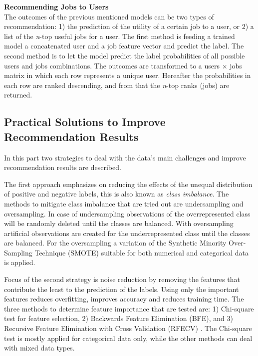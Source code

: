 \noindent
\textbf{Recommending Jobs to Users} \\
The outcomes of the previous mentioned models can be two types of recommendation: 1) the prediction of the utility of a certain job to a user, or 2) a list of the \textit{n}-top useful jobs for a user.
The first method is feeding a trained model a concatenated user and a job feature vector and predict the label.
The second method is to let the model predict the label probabilities of all possible users and jobs combinations. 
The outcomes are transformed to a users $\times$ jobs matrix in which each row represents a unique user.
Hereafter the probabilities in each row are ranked descending, and from that the \textit{n}-top ranks (jobs) are returned. 

\subsection{Practical Solutions to Improve Recommendation Results}
\label{ssec:psirr}
In this part two strategies to deal with the data’s main challenges and  improve recommendation results are described.

The first approach emphasizes on reducing the effects of the unequal distribution of positive and negative labels, this is also known as \textit{class imbalance}. 
The methods to mitigate class imbalance that are tried out are undersampling and oversampling. 
In case of undersampling observations of the overrepresented class will be randomly deleted until the classes are balanced. 
With oversampling artificial observations are created for the underrepresented class until the classes are balanced. 
For the oversampling a variation of the Synthetic Minority Over-Sampling Technique (SMOTE) \cite{chawla2002smote} suitable for both numerical and categorical data is applied. 

Focus of the second strategy is noise reduction by removing the features that contribute the least to the prediction of the labels.
Using only the important features reduces overfitting, improves accuracy and reduces training time. 
The three methods to determine feature importance that are tested are: 1) Chi-square test for feature selection, 2) Backwards Feature Elimination (BFE), and 3) Recursive Feature Elimination with Cross Validation (RFECV) \cite{guyon2002gene}. 
The Chi-square test is mostly applied for categorical data only, while the other methods can deal with mixed data types.
